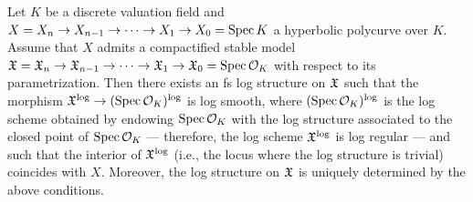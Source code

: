 \begin{prop}\label{LogStructureOnStableCompactification}
  Let $K$ be a discrete valuation field and $X = X_n \to X_{n - 1} \to \cdots \to X_1 \to X_0 = \mathrm{Spec} \, K$ a hyperbolic polycurve over $K$. Assume that $X$ admits a compactified stable model $\mathfrak{X} = \mathfrak{X}_n \to \mathfrak{X}_{n - 1} \to \cdots \to \mathfrak{X}_1 \to \mathfrak{X}_0 = \mathrm{Spec} \, \mathcal{O}_K$ with respect to its parametrization. Then there exists an fs log structure on $\mathfrak{X}$ such that the morphism $\mathfrak{X}^{\mathrm{log}} \to (\mathrm{Spec} \, \mathcal{O}_K)^{\mathrm{log}}$ is log smooth, where $(\mathrm{Spec} \, \mathcal{O}_K)^{\mathrm{log}}$ is the log scheme obtained by endowing $\mathrm{Spec} \, \mathcal{O}_K$ with the log structure associated to the closed point of $\mathrm{Spec} \, \mathcal{O}_K$ --- therefore, the log scheme $\mathfrak{X}^{\mathrm{log}}$ is log regular --- and such that the interior of $\mathfrak{X}^{\mathrm{log}}$ (i.e., the locus where the log structure is trivial) coincides with $X$. Moreover, the log structure on $\mathfrak{X}$ is uniquely determined by the above conditions.
\end{prop}
